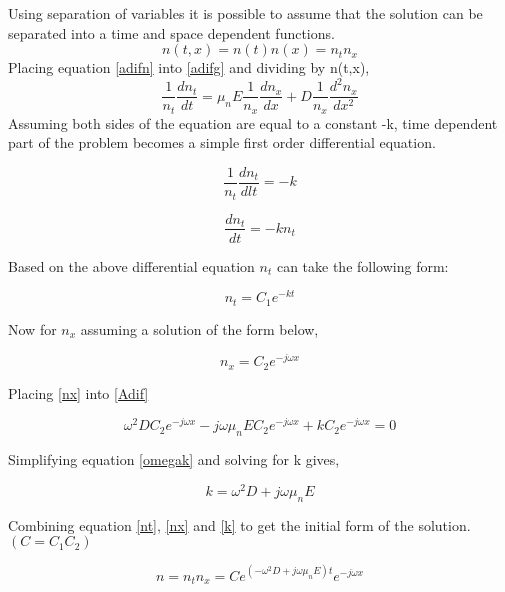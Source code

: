 \begin{doublespace}
Using separation of variables it is possible to assume that the solution can be separated into a time and space dependent functions.
\begin{equation}
n(t,x)=n(t)n(x)=n_t n_x
\label{adifn}
\end{equation}
Placing equation \eqref{adifn} into \eqref{adifg} and dividing by n(t,x),
\begin{equation}
\frac{1}{n_{t}}\frac{d n_{t}}{d t}=\mu_n E \frac{1}{n_{x}}\frac{d n_{x}}{dx}+D\frac{1}{n_{x}}\frac{d^2 n_{x}}{dx^2}
\label{Adif}
\end{equation}
Assuming both sides of the equation are equal to a constant -k, time dependent part of the problem becomes a simple first order differential equation.

\begin{equation}
\nonumber
\frac{1}{n_{t}}\frac{d n_{t}}{dl t}=-k
\end{equation}

\begin{equation}
\nonumber
\frac{d n_{t}}{d t}=-kn_t
\end{equation}

Based on the above differential equation $n_t$ can take the following form:

\begin{equation}
n_t=C_1 e^{-kt}
\label{nt}
\end{equation}

Now for $n_x$ assuming a solution of the form below,

\begin{equation}
n_x=C_2 e^{-j\omega x}
\label{nx}
\end{equation}

Placing \eqref{nx} into \eqref{Adif}

\begin{equation}
\omega^2 D C_2 e^{-j\omega x}-j\omega \mu_n E C_2 e^{-j\omega x}+kC_2e^{-j\omega x}=0
\label{omegak}
\end{equation}

Simplifying equation \eqref{omegak} and solving for k gives,

\begin{equation}
k=\omega^2 D+j\omega \mu_n E
\label{k}
\end{equation}

Combining equation \eqref{nt}, \eqref{nx} and \eqref{k} to get the initial form of the solution. $(C=C_1C_2)$

\begin{equation}
n=n_tn_x=Ce^{(-\omega^2 D + j\omega \mu_n E)t} e^{-j\omega x}
\end{equation}


\end{doublespace}
